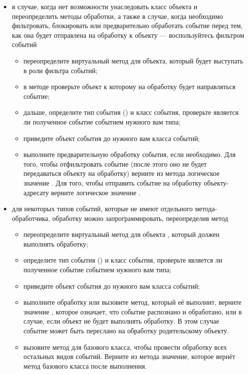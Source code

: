 \begin{itemize}
\item в случае, когда нет возможности унаследовать класс объекта и переопределить методы обработки, а также в случае,
когда необходимо фильтровать, блокировать или предварительно обработать событие перед тем, как она будет отправлена на
обработку к объекту --- воспользуйтесь фильтром событий
 \begin{itemize}
 \item переопределите виртуальный метод  для объекта, который будет выступать в
 роли фильтра событий;
 \item в методе  проверьте объект к которому на обработку будет направляться событие;
 \item дальше, определите тип события () и класс события, проверьте является ли полученное
 событие событием нужного вам типа;
 \item приведите объект события до нужного вам класса событий;
 \item выполните предварительную обработку события, если необходимо. Для того, чтобы отфильтровать событие (после этого
 оно не будет передаваться объекту на обработку) верните из метода логическое значение . Для того, чтобы отправить
 событие на обработку объекту-адресату верните логическое значение .
 \end{itemize}

\item для некоторых типов событий, которые не имеют отдельного метода-обработчика, обработку можно запрограммировать,
переопределив метод  
 \begin{itemize}
 \item переопределите виртуальный метод для объекта , который должен выполнять обработку;
 \item определите тип события () и класс события, проверьте является  ли полученное событие
 событием нужного вам типа;
 \item приведите объект события до нужного вам класса событий;
 \item выполните обработку или вызовите метод, который её выполнит, верните значение , которое означает, что событие
 распознано и обработано, или  в случае, если объект не будет выполнять обработку. В этом случае событие может быть
 переслано на обработку родительскому объекту.
 \item вызовите метод  для базового класса, чтобы провести обработку всех остальных видов событий.
 Верните из метода значение, которое вернёт метод  базового класса после выполнения.
\end{itemize}


\end{itemize}
